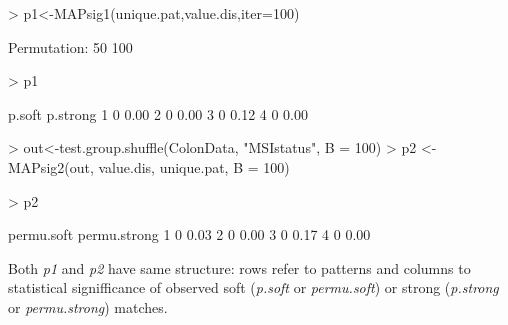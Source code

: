 \documentclass[a4paper]{report}
\begin{document}
\begin{Schunk}
\begin{Sinput}
> p1<-MAPsig1(unique.pat,value.dis,iter=100)
\end{Sinput}
\begin{Soutput}
Permutation: 
50 
100 
\end{Soutput}
\begin{Sinput}
> p1
\end{Sinput}
\begin{Soutput}
  p.soft p.strong
1      0     0.00
2      0     0.00
3      0     0.12
4      0     0.00
\end{Soutput}
\end{Schunk}
\begin{Schunk}
\begin{Sinput}
> out<-test.group.shuffle(ColonData, "MSIstatus", B = 100)
> p2 <- MAPsig2(out, value.dis, unique.pat, B = 100)
\end{Sinput}
\end{Schunk}
\begin{Schunk}
\begin{Sinput}
> p2
\end{Sinput}
\begin{Soutput}
  permu.soft permu.strong
1          0         0.03
2          0         0.00
3          0         0.17
4          0         0.00
\end{Soutput}
\end{Schunk}
Both \emph{p1} and \emph{p2} have same structure: rows refer to patterns and columns to statistical signifficance of observed soft (\emph{p.soft} or \emph{permu.soft}) or strong (\emph{p.strong} or \emph{permu.strong}) matches. 
\end{document}
